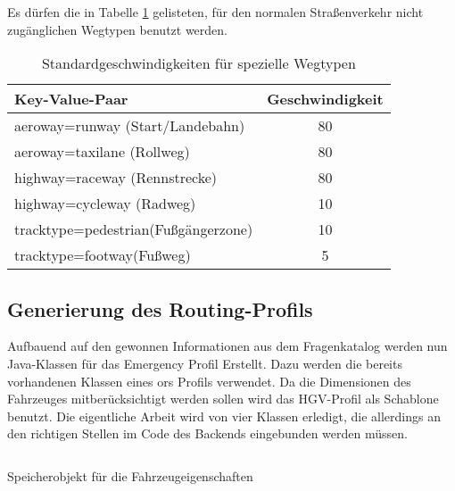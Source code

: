 Es dürfen die in Tabelle \ref{tab:speedinfospecial} gelisteten, für den normalen Straßenverkehr nicht zugänglichen Wegtypen benutzt werden.

\begin{table}
\caption{Standardgeschwindigkeiten für spezielle Wegtypen}
\label{tab:speedinfospecial}
\centering
\begin{tabular}{|l|c|}
\hline
\multicolumn{1}{|l|}{Key-Value-Paar} & \multicolumn{1}{c|}{Geschwindigkeit} \\
\hline
aeroway=runway (Start/Landebahn) & 80 \\
aeroway=taxilane (Rollweg) & 80 \\
highway=raceway (Rennstrecke) & 80 \\
highway=cycleway (Radweg) & 10 \\
tracktype=pedestrian(Fußgängerzone) & 10\\
tracktype=footway(Fußweg) & 5\\
\hline
\end{tabular}
\end{table}



\subsection{Generierung des Routing-Profils}
\label{backendGraphBuild}

Aufbauend auf den gewonnen Informationen aus dem Fragenkatalog werden nun Java-Klassen für das Emergency Profil Erstellt.
Dazu werden die bereits vorhandenen Klassen eines \gls{ors} Profils verwendet.
Da die Dimensionen des Fahrzeuges mitberücksichtigt werden sollen wird das HGV-Profil als Schablone benutzt.
Die eigentliche Arbeit wird von vier Klassen erledigt, die allerdings an den richtigen Stellen im Code des Backends eingebunden werden müssen.

\begin{listing}[h]
\centering
{}
\inputminted[fontsize=\footnotesize, breaklines, breakanywhere, firstline=26, lastline=47]{java}{../data/JavaFiles/EmergencyVehicleAttributesGraphStorage.java}
\caption{Speicherobjekt für die Fahrzeugeigenschaften}
\label{lst:storage}
\end{listing}

